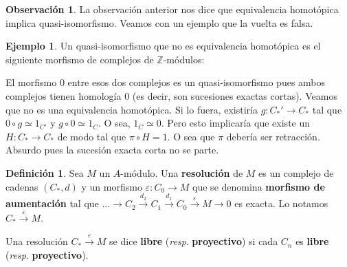 \documentclass[12pt]{book}
\theoremstyle{definition}
\newtheorem{obs}[teo]{Observación}
\newtheorem{defn}[teo]{Definición}
\newtheorem{ex}[teo]{Ejemplo}
\newcommand{\ZZ}{\mathbb{Z}}      %
\begin{document}
\begin{obs}
La observación anterior nos dice que equivalencia homotópica implica quasi-isomorfismo. Veamos con un ejemplo que la vuelta es falsa.
\end{obs}

\begin{ex}
Un quasi-isomorfismo que no es equivalencia homotópica es el siguiente morfismo de complejos de $\ZZ$-módulos:

\begin{center}\end{center}

El morfismo $0$ entre esos dos complejos es un quasi-isomorfismo pues ambos complejos tienen homología $0$ (es decir, son sucesiones exactas cortas). Veamos que no es una equivalencia homotópica. Si lo fuera, existiría $g:C_*' \to C_*$ tal que $0\circ g\simeq 1_{C'}$ y $g\circ 0\simeq 1_C$. O sea, $1_C\simeq 0$. Pero esto implicaría que existe un $H:C_*\to C_*$ de modo tal que $\pi\circ H = 1$. O sea que $\pi$ debería ser retracción. Absurdo pues la sucesión exacta corta no se parte.

\end{ex}

\begin{defn}
Sea $M$ un $A$-módulo. Una \textbf{resolución} de $M$ es un complejo de cadenas $(C_*,d)$ y un morfismo $\varepsilon:C_0\to M$ que se denomina \textbf{morfismo de aumentación} tal que $\ldots\longrightarrow C_2\stackrel{d_2}{\longrightarrow}C_1\stackrel{d_1}{\longrightarrow} C_0\stackrel{\varepsilon}{\longrightarrow} M\longrightarrow 0$ es exacta. Lo notamos $C_*\stackrel{\varepsilon}{\longrightarrow}M$.

Una resolución $C_*\stackrel{\varepsilon}{\longrightarrow}M$ se dice \textbf{libre} (\textit{resp}. \textbf{proyectivo}) si cada $C_n$ es \textbf{libre} (\textit{resp}. \textbf{proyectivo}).
\end{defn}
\end{document}
